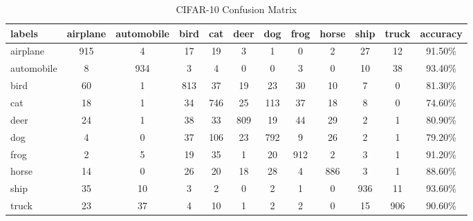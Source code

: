 \documentclass[conference,a4paper]{IEEEtran}
\begin{document}
\begin{table*}
 \caption{CIFAR-10 Confusion Matrix}
\label{my-label}
\begin{tabularx}{\textwidth}{@{}l*{10}{C}c@{}}
\toprule
labels     & airplane & automobile & bird & cat & deer & dog & frog & horse & ship & truck & accuracy \\ 
\midrule
airplane   & 915      & 4          & 17   & 19  & 3    & 1   & 0    & 2     & 27   & 12    & 91.50\%  \\ 
automobile & 8        & 934        & 3    & 4   & 0    & 0   & 3    & 0     & 10   & 38    & 93.40\%  \\ 
bird       & 60       & 1          & 813  & 37  & 19   & 23  & 30   & 10    & 7    & 0     & 81.30\%  \\ 
cat        & 18       & 1          & 34   & 746 & 25   & 113 & 37   & 18    & 8    & 0     & 74.60\%  \\ 
deer       & 24       & 1          & 38   & 33  & 809  & 19  & 44   & 29    & 2    & 1     & 80.90\%  \\ 
\addlinespace
dog        & 4        & 0          & 37   & 106 & 23   & 792 & 9    & 26    & 2    & 1     & 79.20\%  \\ 
frog       & 2        & 5          & 19   & 35  & 1    & 20  & 912  & 2     & 3    & 1     & 91.20\%  \\ 
horse      & 14       & 0          & 26   & 20  & 18   & 28  & 4    & 886   & 3    & 1     & 88.60\%  \\ 
ship       & 35       & 10         & 3    & 2   & 0    & 2   & 1    & 0     & 936  & 11    & 93.60\%  \\ 
truck      & 23       & 37         & 4    & 10  & 1    & 2   & 2    & 0     & 15   & 906   & 90.60\%  \\ 
\bottomrule
\end{tabularx}
\end{table*}

%
%
\end{document}
